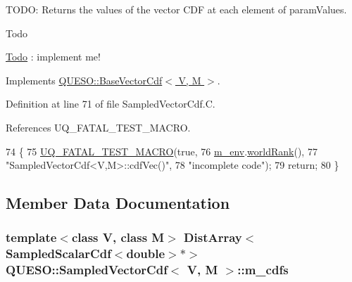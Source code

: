 T\-O\-D\-O\-: Returns the values of the vector C\-D\-F at each element of {\ttfamily param\-Values}. 

\begin{DoxyRefDesc}{Todo}
\item[\hyperlink{todo__todo000041}{Todo}]\-: implement me! \end{DoxyRefDesc}


Implements \hyperlink{class_q_u_e_s_o_1_1_base_vector_cdf_a30b15bde5a206071b4e4db26141ce179}{Q\-U\-E\-S\-O\-::\-Base\-Vector\-Cdf$<$ V, M $>$}.



Definition at line 71 of file Sampled\-Vector\-Cdf.\-C.



References U\-Q\-\_\-\-F\-A\-T\-A\-L\-\_\-\-T\-E\-S\-T\-\_\-\-M\-A\-C\-R\-O.


\begin{DoxyCode}
74 \{
75   \hyperlink{_defines_8h_a56d63d18d0a6d45757de47fcc06f574d}{UQ\_FATAL\_TEST\_MACRO}(\textcolor{keyword}{true},
76                       \hyperlink{class_q_u_e_s_o_1_1_base_vector_cdf_aa1effe370ac016f1fc7eaf538c5751a6}{m\_env}.\hyperlink{class_q_u_e_s_o_1_1_base_environment_a78b57112bbd0e6dd0e8afec00b40ffa7}{worldRank}(),
77                       \textcolor{stringliteral}{"SampledVectorCdf<V,M>::cdfVec()"},
78                       \textcolor{stringliteral}{"incomplete code"});
79   \textcolor{keywordflow}{return};
80 \}
\end{DoxyCode}


\subsection{Member Data Documentation}
\hypertarget{class_q_u_e_s_o_1_1_sampled_vector_cdf_ab1bc899ffdea9ca7e635312f82ff169f}{
\subsubsection[{m\-\_\-cdfs}]{\setlength{\rightskip}{0pt plus 5cm}template$<$class V, class M$>$ {\bf Dist\-Array}$<${\bf Sampled\-Scalar\-Cdf}$<$double$>$$\ast$$>$ {\bf Q\-U\-E\-S\-O\-::\-Sampled\-Vector\-Cdf}$<$ V, M $>$\-::m\-\_\-cdfs\hspace{0.3cm}{\ttfamily [protected]}}}\label{class_q_u_e_s_o_1_1_sampled_vector_cdf_ab1bc899ffdea9ca7e635312f82ff169f}


